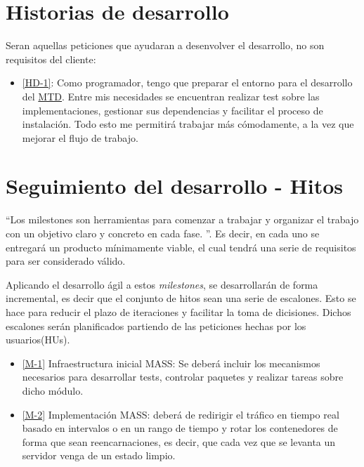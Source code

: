 \section{Historias de desarrollo}
Seran aquellas peticiones que ayudaran a desenvolver el desarrollo, no son requisitos del cliente:

\begin{itemize}
    \item \href{https://github.com/marcosrmartin/MTD_Server/issues/16}{[HD-1]}: Como programador, tengo que preparar el entorno para el desarrollo del \href{https://github.com/marcosrmartin/MTD_Server/commit/20df5bb6f5af3de7e557c254ad47089db34845aa}{MTD}. Entre mis necesidades se encuentran realizar test sobre las implementaciones, gestionar sus dependencias y facilitar el proceso de instalación. Todo esto me permitirá trabajar más cómodamente, a la vez que mejorar el flujo de trabajo.
\end{itemize}

\section{Seguimiento del desarrollo - Hitos}
``Los milestones son herramientas para comenzar a trabajar y organizar el trabajo con un objetivo claro y concreto en cada fase.
''\cite{iv}. Es decir, en cada uno se entregará un producto mínimamente viable, el cual tendrá una serie de requisitos para ser considerado válido.

Aplicando el desarrollo ágil a estos \textit{milestones}, se desarrollarán de forma incremental, es decir que el conjunto de hitos sean una serie de escalones. Esto se hace para reducir el plazo de iteraciones y facilitar la toma de dicisiones. Dichos escalones serán planificados partiendo de las peticiones hechas por los usuarios(HUs).


\begin{itemize}
    \item \href{https://github.com/marcosrmartin/MTD_Server/milestone/3}{[M-1]} Infraestructura inicial MASS: Se deberá incluir los mecanismos necesarios para desarrollar tests, controlar paquetes y realizar tareas sobre dicho módulo.
    \item \href{https://github.com/marcosrmartin/MTD_Server/milestone/2}{[M-2]} Implementación MASS: deberá de redirigir el tráfico en tiempo real basado en intervalos o en un rango de tiempo y rotar los contenedores de forma que sean reencarnaciones, es decir, que cada vez que se levanta un servidor venga de un estado limpio.
\end{itemize}

